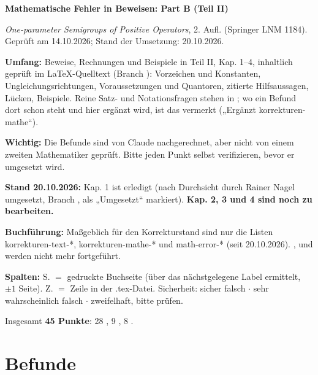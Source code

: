\documentclass[10pt]{article}
\begin{document}
{\Large\bfseries Mathematische Fehler in Beweisen: Part B (Teil II)\par}
\smallskip
\emph{One-parameter Semigroups of Positive Operators}, 2. Aufl. (Springer LNM 1184). Geprüft am 14.10.2026; Stand der Umsetzung: 20.10.2026.

\textbf{Umfang:} Beweise, Rechnungen und Beispiele in Teil II, Kap. 1–4, inhaltlich geprüft im LaTeX-Quelltext (Branch ): Vorzeichen und Konstanten, Ungleichungsrichtungen, Voraussetzungen und Quantoren, zitierte Hilfsaussagen, Lücken, Beispiele. Reine Satz- und Notationsfragen stehen in ; wo ein Befund dort schon steht und hier ergänzt wird, ist das vermerkt („Ergänzt korrekturen-mathe“).

\textbf{Wichtig:} Die Befunde sind von Claude nachgerechnet, aber nicht von einem zweiten Mathematiker geprüft. Bitte jeden Punkt selbst verifizieren, bevor er umgesetzt wird.

\textbf{Stand 20.10.2026:} Kap. 1 ist erledigt (nach Durchsicht durch Rainer Nagel umgesetzt, Branch , als „Umgesetzt“ markiert). \textbf{Kap. 2, 3 und 4 sind noch zu bearbeiten.}

\textbf{Buchführung:} Maßgeblich für den Korrekturstand sind nur die Listen {korrekturen-text-*}, {korrekturen-mathe-*} und {math-error-*} (seit 20.10.2026). ,  und  werden nicht mehr fortgeführt.

\textbf{Spalten:} S. $=$ gedruckte Buchseite (über das nächstgelegene Label ermittelt, $\ensuremath{\pm}1$ Seite). Z. $=$ Zeile in der .tex-Datei. Sicherheit: \sichA{} sicher falsch $\ensuremath{\cdot}$ \sichB{} sehr wahrscheinlich falsch $\ensuremath{\cdot}$ \sichC{} zweifelhaft, bitte prüfen.

Insgesamt \textbf{45 Punkte}: 28 \sichA{}, 9 \sichB{}, 8 \sichC{}.

\section*{Befunde}
\end{document}
